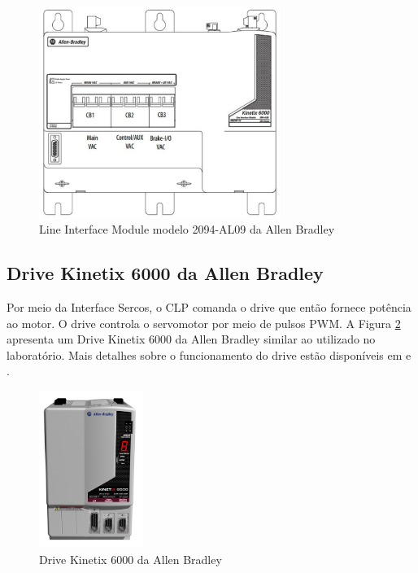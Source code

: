 \begin{figure}[!ht]
  \centering
    \includegraphics[width=0.7\textwidth]{figs/fundamentos/LineInterfaceModule}
    \caption{Line Interface Module modelo 2094-AL09 da Allen Bradley \cite{redytton}\label{LineInterfaceModule}}
\end{figure}

\subsection{Drive Kinetix 6000 da Allen Bradley}

Por meio da Interface Sercos, o CLP comanda o drive que então fornece potência ao motor. O drive controla o servomotor por meio de pulsos PWM. A Figura \ref{kinetix6000} apresenta um Drive Kinetix 6000 da Allen Bradley similar ao utilizado no laboratório. Mais detalhes sobre o funcionamento do drive estão disponíveis em \cite{redytton} e \cite{kinetix6000usermanual}.

\begin{figure}[!ht]
  \centering
    \includegraphics[width=0.3\textwidth]{figs/fundamentos/kinetix6000.jpg}
    \caption{Drive Kinetix 6000 da Allen Bradley\label{kinetix6000}}
\end{figure}

